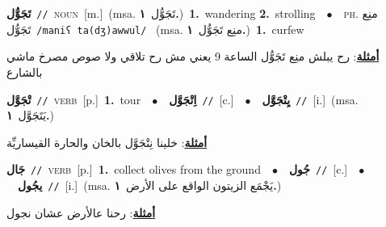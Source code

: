 \documentclass[10pt,a4paper,twoside]{article} %
\begin{document}
\begin{multicols}{2}
{\setlength\topsep{0pt}\textbf{\foreignlanguage{arabic}{تَجَوُّل}}\ {\color{gray}\texttt{//}\color{black}}\ \textsc{noun}\ [m.]\ \color{gray}(msa. \foreignlanguage{arabic}{تَجَوُّل}~\foreignlanguage{arabic}{\textbf{١.}})\color{black}\ \textbf{1.}~wandering  \textbf{2.}~strolling\ \ $\bullet$\ \ \textsc{ph.} \color{gray} \foreignlanguage{arabic}{منِع تَجَوُّل}\color{black}\ {\color{gray}\texttt{/{\sffamily maniʕ ta(dʒ)awwul}/}\color{black}}\ \color{gray} (msa. \foreignlanguage{arabic}{منِع تَجَوُّل}~\foreignlanguage{arabic}{\textbf{١.}})\color{black}\ \textbf{1.}~curfew\  \begin{flushright}\color{gray}\foreignlanguage{arabic}{\textbf{\underline{\foreignlanguage{arabic}{أمثلة}}}: رح يبلش منِع تَجَوُّل الساعة 9 يعني مش رح تلاقي ولا صوص مصرخ ماشي بالشارع}\end{flushright}\color{black}} \vspace{2mm}

{\setlength\topsep{0pt}\textbf{\foreignlanguage{arabic}{تْجَوَّل}}\ {\color{gray}\texttt{//}\color{black}}\ \textsc{verb}\ [p.]\ \textbf{1.}~tour\ \ $\bullet$\ \ \setlength\topsep{0pt}\textbf{\foreignlanguage{arabic}{اِتْجَوَّل}}\ {\color{gray}\texttt{//}\color{black}}\ [c.]\ \ $\bullet$\ \ \setlength\topsep{0pt}\textbf{\foreignlanguage{arabic}{يِتْجَوَّل}}\ {\color{gray}\texttt{//}\color{black}}\ [i.]\ \color{gray}(msa. \foreignlanguage{arabic}{يَتَجَوَّل}~\foreignlanguage{arabic}{\textbf{١.}})\color{black}\  \begin{flushright}\color{gray}\foreignlanguage{arabic}{\textbf{\underline{\foreignlanguage{arabic}{أمثلة}}}: خلينا نِتْجَوَّل بالخان والحارة القيساريِّة}\end{flushright}\color{black}} \vspace{2mm}

{\setlength\topsep{0pt}\textbf{\foreignlanguage{arabic}{جَال}}\ {\color{gray}\texttt{//}\color{black}}\ \textsc{verb}\ [p.]\ \textbf{1.}~collect olives from the ground\ \ $\bullet$\ \ \setlength\topsep{0pt}\textbf{\foreignlanguage{arabic}{جُول}}\ {\color{gray}\texttt{//}\color{black}}\ [c.]\ \ $\bullet$\ \ \setlength\topsep{0pt}\textbf{\foreignlanguage{arabic}{يجُول}}\ {\color{gray}\texttt{//}\color{black}}\ [i.]\ \color{gray}(msa. \foreignlanguage{arabic}{يَجْمَع الزيتون الواقع على الأرض}~\foreignlanguage{arabic}{\textbf{١.}})\color{black}\  \begin{flushright}\color{gray}\foreignlanguage{arabic}{\textbf{\underline{\foreignlanguage{arabic}{أمثلة}}}: رحنا عالأرض عشان نجول}\end{flushright}\color{black}} \vspace{2mm}


\end{multicols}
\end{document}
